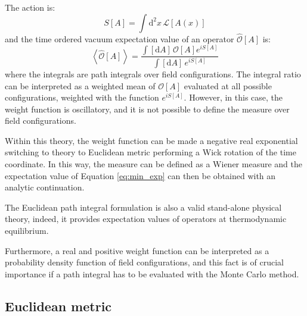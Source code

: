 The action is:
\[ S[A] = \int \mathrm d^2x\, \mathcal L[A(x)]
\]
and the time ordered vacuum expectation value of an operator $\widehat{\mathcal O}[A]$ is:
\begin{equation}\label{eq:min_exp}
    \left< \widehat{\mathcal O}[A] \right> = \frac{\int[\mathrm dA]\, \mathcal O[A] e^{iS[A]}}{\int[\mathrm dA]\,e^{iS[A]}}
\end{equation}
where the integrals are path integrals over field configurations.
The integral ratio can be interpreted as a weighted mean of $\mathcal O[A]$ evaluated at all possible configurations, weighted with the function $e^{iS[A]}$.
However, in this case, the weight function is oscillatory, and it is not possible to define the measure over field configurations.

Within this theory, the weight function can be made a negative real exponential switching to theory to Euclidean metric performing a Wick rotation of the time coordinate.
In this way, the measure can be defined as a Wiener measure and the expectation value of Equation \eqref{eq:min_exp} can then be obtained with an analytic continuation.

The Euclidean path integral formulation is also a valid stand-alone physical theory, indeed,
it provides expectation values of operators at thermodynamic equilibrium.

Furthermore, a real and positive weight function can be interpreted as a probability density function of field configurations,
and this fact is of crucial importance if a path integral has to be evaluated with the Monte Carlo method.

\subsection*{Euclidean metric}

